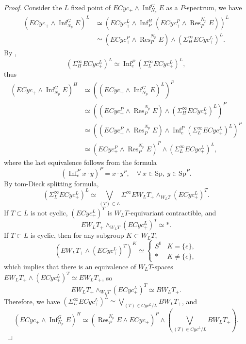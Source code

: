\documentclass[10pt,a4paper]{amsart}
\begin{document}
\begin{proof}
    Consider the $L$ fixed point of $ECyc_+\wedge \operatorname{Inf}_{N_p}^G E$ as a $P$-spectrum, we have
    \[
    \begin{aligned}
        (ECyc_+\wedge \operatorname{Inf}_{N_p}^G E)^L & \simeq (ECyc^L_+\wedge \operatorname{Inf}_{P}^{H} (ECyc^P_+\wedge \operatorname{Res}_{P}^{N_p}E))^L \\
        & \simeq (ECyc^P_+\wedge \operatorname{Res}_{P}^{N_p}E) \wedge (\Sigma_H^\infty ECyc_+^L)^L.
    \end{aligned}
    \] 
    By , 
    \[
    (\Sigma_H^\infty ECyc_+^L)^L\simeq \operatorname{Inf}_e^{P}(\Sigma_L^\infty ECyc_+^L)^L,
    \] 
    thus
    \[
    \begin{aligned}
        (ECyc_+\wedge \operatorname{Inf}_{N_p}^G E)^H&\simeq ((ECyc_+\wedge \operatorname{Inf}_{N_p}^G E)^L)^P \\
        &\simeq ((ECyc^P_+\wedge \operatorname{Res}_{P}^{N_p}E) \wedge (\Sigma_H^\infty ECyc_+^L)^L)^P\\
        &\simeq ((ECyc^P_+\wedge \operatorname{Res}_{P}^{N_p}E) \wedge \operatorname{Inf}_e^{P}(\Sigma_L^\infty ECyc_+^L)^L)^P\\
        &\simeq (ECyc^P_+\wedge \operatorname{Res}_{P}^{N_p}E)^P \wedge (\Sigma_L^\infty ECyc_+^L)^L,
    \end{aligned}
    \]
    where the last equivalence follows from the formula 
    \[
    (\operatorname{Inf}_e^P x\cdot y)^P=x\cdot y^P, \quad \forall \ x\in \mathrm{Sp}, \ y\in \mathrm{Sp}^P.
    \]
    By tom-Dieck splitting formula, 
    \[
    (\Sigma_L^\infty ECyc_+^L)^L\simeq \bigvee_{(T)\subset L}\Sigma^\infty EW_L T_+\wedge_{W_L T} (ECyc^L_+)^T.
    \] 
    If $T\subset L$ is not cyclic, $(ECyc^L_+)^T$ is $W_L T$-equivariant contractible, and 
    \[ EW_L T_+\wedge_{W_L T} (ECyc^L_+)^T\simeq \ast.\] 
    If $T\subset L$ is cyclic, then for any subgroup $K \subset W_L T$,
    \[
    (EW_L T_+\wedge (ECyc_+^L)^T)^{K}\simeq\begin{cases}
        S^0 & K=\{e\},\\
        \ast & K\neq \{e\},
    \end{cases}
    \]
    which implies that there is an equivalence of $W_L T$-spaces $EW_L T_+\wedge (ECyc_+^L)^T\simeq EW_L T_+$, so 
    \[
    EW_L T_+\wedge_{W_L T} (ECyc^L_+)^T\simeq BW_L T_+.
    \] 
    Therefore, we have $(\Sigma_L^\infty ECyc_+^L)^L\simeq \bigvee_{(T)\in Cyc^L/L}BW_L T_+$, and 
    \[  
    (ECyc_+\wedge \operatorname{Inf}_{N_p}^G E)^H \simeq (\operatorname{Res}_P^{N_p} E\wedge ECyc_+)^P \wedge (\bigvee_{(T)\in Cyc^L/L}BW_L T_+).
    \]
\end{proof}
\end{document}

